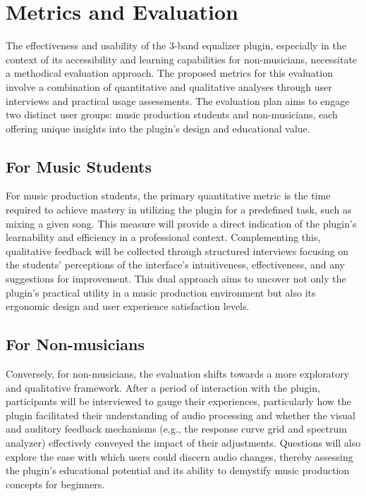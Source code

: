 \documentclass[10pt,twocolumn]{article}
\begin{document}
\section{Metrics and Evaluation}
The effectiveness and usability of the 3-band equalizer plugin, especially in the context of its accessibility and learning capabilities for non-musicians, necessitate a methodical evaluation approach. The proposed metrics for this evaluation involve a combination of quantitative and qualitative analyses through user interviews and practical usage assessments. The evaluation plan aims to engage two distinct user groups: music production students and non-musicians, each offering unique insights into the plugin's design and educational value.

\subsection{For Music Students}
For music production students, the primary quantitative metric is the time required to achieve mastery in utilizing the plugin for a predefined task, such as mixing a given song. This measure will provide a direct indication of the plugin's learnability and efficiency in a professional context. Complementing this, qualitative feedback will be collected through structured interviews focusing on the students' perceptions of the interface's intuitiveness, effectiveness, and any suggestions for improvement. This dual approach aims to uncover not only the plugin's practical utility in a music production environment but also its ergonomic design and user experience satisfaction levels.

\subsection{For Non-musicians}
Conversely, for non-musicians, the evaluation shifts towards a more exploratory and qualitative framework. After a period of interaction with the plugin, participants will be interviewed to gauge their experiences, particularly how the plugin facilitated their understanding of audio processing and whether the visual and auditory feedback mechanisms (e.g., the response curve grid and spectrum analyzer) effectively conveyed the impact of their adjustments. Questions will also explore the ease with which users could discern audio changes, thereby assessing the plugin's educational potential and its ability to demystify music production concepts for beginners.
\end{document}
